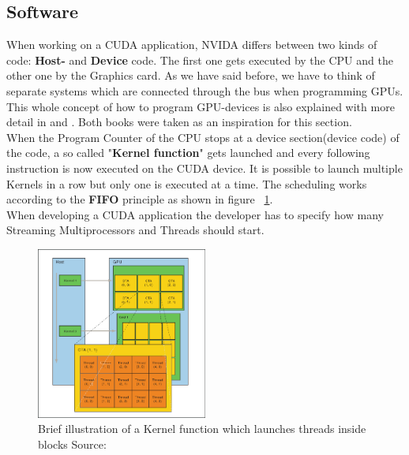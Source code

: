 \documentclass[draft, final]{vutinfth} %
\begin{document}
		\subsection{Software}
			When working on a CUDA application, NVIDA differs between two kinds of code: \textbf{Host-} and \textbf{Device} code. The first one gets executed by the CPU and the other one by the Graphics card. As we have said before, we have to think of separate systems which are connected through the bus when programming GPUs. This whole concept of how to program GPU-devices is also explained with more detail in \cite{Sanders:2010:CEI:1891996} and \cite{Kirk:2010:PMP:1841511}. Both books were taken as an inspiration for this section.\\
			When the Program Counter of the CPU stops at a device section(device code) of the code, a so called "\textbf{Kernel function}" gets launched and every following instruction is now executed on the CUDA device. It is possible to launch multiple Kernels in a row but only one is executed at a time. The scheduling works according to the \textbf{FIFO} principle as shown in figure ~\ref{fig:kernel_launch}.\\
			When developing a CUDA application the developer has to specify how many Streaming Multiprocessors and Threads should start.

			\begin{figure}[!ht]
			    \centering
			    \includegraphics[width=0.5\textwidth,keepaspectratio=true]{images/thread-batching.png}
			    \caption{Brief illustration of a Kernel function which launches threads inside blocks Source: \cite{toolkit}}
			    \label{fig:kernel_launch}
			\end{figure}
\end{document}
